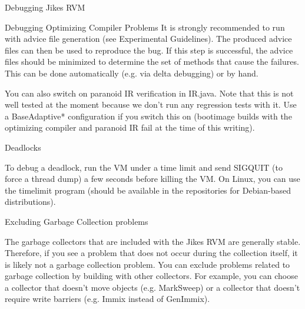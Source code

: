 \begin{section}{Debugging Jikes RVM}
\begin{subsection}{Debugging Optimizing Compiler Problems}
It is strongly recommended to run with advice file generation (see Experimental Guidelines). The produced advice files can then be used to reproduce the bug. If this step is successful, the advice files should be minimized to determine the set of methods that cause the failures. This can be done automatically (e.g. via delta debugging) or by hand.

You can also switch on paranoid IR verification in IR.java. Note that this is not well tested at the moment because we don't run any regression tests with it. Use a BaseAdaptive* configuration if you switch this on (bootimage builds with the optimizing compiler and paranoid IR fail at the time of this writing).

\begin{subsubsection}{Deadlocks}

To debug a deadlock, run the VM under a time limit and send SIGQUIT (to force a thread dump) a few seconds before killing the VM. On Linux, you can use the timelimit program (should be available in the repositories for Debian-based distributions).
\end{subsubsection}

\begin{subsubsection}{Excluding Garbage Collection problems}

The garbage collectors that are included with the Jikes RVM are generally stable. Therefore, if you see a problem that does not occur during the collection itself, it is likely not a garbage collection problem. You can exclude problems related to garbage collection by building with other collectors. For example, you can choose a collector that doesn't move objects (e.g. MarkSweep) or a collector that doesn't require write barriers (e.g. Immix instead of GenImmix).
\end{subsubsection}

\end{subsection}

\end{section}